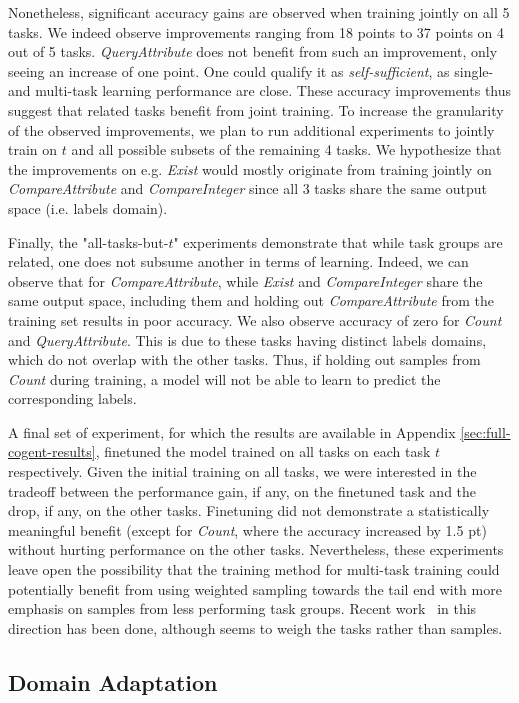 Nonetheless, significant accuracy gains are observed when training jointly on all 5 tasks. We indeed observe improvements ranging from 18 points to 37 points on 4 out of 5 tasks. \textit{QueryAttribute} does not benefit from such an improvement, only seeing an increase of one point. One could qualify it as \textit{self-sufficient}, as single- and multi-task learning performance are close.
These accuracy improvements thus suggest that related tasks benefit from joint training. %
To increase the granularity of the observed improvements, we plan to run additional experiments to jointly train on $t$ and all possible subsets of the remaining 4 tasks. We hypothesize that the improvements on e.g. \textit{Exist} would mostly originate from training jointly on \textit{CompareAttribute} and \textit{CompareInteger} since all 3 tasks share the same output space (i.e. labels domain).

Finally, the "all-tasks-but-$t$" experiments demonstrate that while task groups are related, one does not subsume another in terms of learning. Indeed, we can observe that for \textit{CompareAttribute}, while \textit{Exist} and \textit{CompareInteger} share the same output space, including them and holding out \textit{CompareAttribute} from the training set results in poor accuracy. We also observe accuracy of zero for \textit{Count} and \textit{QueryAttribute}. This is due to these tasks having distinct labels domains, which do not overlap with the other tasks. Thus, if holding out samples from \textit{Count} during training, a model will not be able to learn to predict the corresponding labels.

 
A final set of experiment, for which the results are available in Appendix \ref{sec:full-cogent-results}, finetuned the model trained on all tasks on each task $t$ respectively. Given the initial training on all tasks, we were interested in the tradeoff between the performance gain, if any, on the finetuned task and the drop, if any, on the other tasks. Finetuning did not demonstrate a statistically meaningful benefit (except for \textit{Count}, where the accuracy increased by 1.5 pt) without hurting performance on the other tasks. Nevertheless, these experiments leave open the possibility that the training method for multi-task training could potentially benefit from using weighted sampling towards the tail end with more emphasis on samples from less performing task groups. Recent work~\cite{guo2018dynamic, kendall2018multi} in this direction has been done, although seems to weigh the tasks rather than samples.

\subsection{Domain Adaptation}

